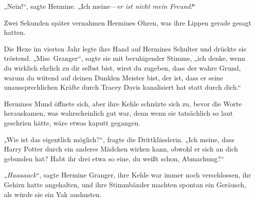 „Nein!“, sagte Hermine. „Ich meine—\emph{er ist nicht mein Freund!}“

Zwei Sekunden später vernahmen Hermines Ohren, was ihre Lippen gerade gesagt hatten.

Die Hexe im vierten Jahr legte ihre Hand auf Hermines Schulter und drückte sie tröstend. „Miss~Granger“, sagte sie mit beruhigender Stimme, „ich denke, wenn du wirklich ehrlich zu dir selbst bist, wirst du zugeben, dass der wahre Grund, warum du wütend auf deinen Dunklen Meister bist, der ist, dass er seine unaussprechlichen Kräfte durch Tracey Davis kanalisiert hat statt durch dich.“

Hermines Mund öffnete sich, aber ihre Kehle schnürte sich zu, bevor die Worte herauskamen, was wahrscheinlich gut war, denn wenn sie tatsächlich so laut geschrien hätte, wäre etwas kaputt gegangen.

„Wie ist das eigentlich möglich?“, fragte die Drittklässlerin. „Ich meine, dass Harry Potter durch ein anderes Mädchen wirken kann, obwohl er sich an dich gebunden hat? Habt ihr drei etwa so eine, du weißt schon, Abmachung?“

„\emph{Haaaaack}“, sagte Hermine Granger, ihre Kehle war immer noch verschlossen, ihr Gehirn hatte angehalten, und ihre Stimmbänder machten spontan ein Geräusch, als würde sie ein Yak aushusten.


